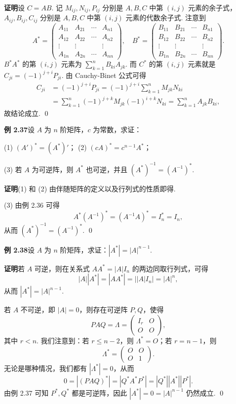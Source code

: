 \documentclass[UTF8, 12pt, fontset=fandol, oneside]{ctexart}
\begin{document}
\noindent\textbf{证明}\quad 设 $C=AB$. 记 $M_{ij},N_{ij},P_{ij}$ 分别是 $A,B,C$ 中第 $(i,j)$ 元素的余子式，$A_{ij},B_{ij},C_{ij}$ 分别是 $A,B,C$ 中第 $(i,j)$ 元素的代数余子式. 注意到
\[
A^*=
\left(
\begin{array}{cccc}
A_{11} & A_{21} & \cdots & A_{n1}\\
A_{12} & A_{22} & \cdots & A_{n2}\\
\vdots & \vdots & & \vdots\\
A_{1n} & A_{2n} & \cdots & A_{nn}
\end{array}
\right),\quad
B^*=
\left(
\begin{array}{cccc}
B_{11} & B_{21} & \cdots & B_{n1}\\
B_{12} & B_{22} & \cdots & B_{n2}\\
\vdots & \vdots & & \vdots\\
B_{1n} & B_{2n} & \cdots & B_{nn}
\end{array}
\right).
\]
$B^*A^*$ 的第 $(i,j)$ 元素为 $\sum\limits_{k=1}^n B_{ki}A_{jk}$. 而 $C^*$ 的第 $(i,j)$ 元素就是 $C_{ji}=(-1)^{j+i}P_{ji}$. 由 Cauchy-Binet 公式可得
\[
\begin{aligned}
C_{ji}
&=(-1)^{j+i}P_{ji}
=(-1)^{j+i}\sum_{k=1}^n M_{jk}N_{ki}\\
&=\sum_{k=1}^n(-1)^{j+k}M_{jk}(-1)^{i+k}N_{ki}
=\sum_{k=1}^n A_{jk}B_{ki},
\end{aligned}
\]
故结论成立. \qed

\noindent\textbf{例 2.37}\quad 设 $A$ 为 $n$ 阶矩阵，$c$ 为常数，求证：

(1) $(A')^*=(A^*)'$；\qquad
(2) $(cA)^*=c^{n-1}A^*$；

(3) 若 $A$ 为可逆阵，则 $A^*$ 也可逆，并且 $(A^*)^{-1}=(A^{-1})^*$.

\noindent\textbf{证明}\quad (1) 和 (2) 由伴随矩阵的定义以及行列式的性质即得.

(3) 由例 2.36 可得
\[
A^*(A^{-1})^*=(A^{-1}A)^*=I_n^*=I_n,
\]
从而 $(A^*)^{-1}=(A^{-1})^*$. \qed

\noindent\textbf{例 2.38}\quad 设 $A$ 为 $n$ 阶矩阵，求证：$|A^*|=|A|^{n-1}$.

\noindent\textbf{证明}\quad 若 $A$ 可逆，则在关系式 $AA^*=|A|I_n$ 的两边同取行列式，可得
\[
|A||A^*|=|AA^*|=||A|I_n|=|A|^n,
\]
从而 $|A^*|=|A|^{n-1}$.

若 $A$ 不可逆，即 $|A|=0$，则存在可逆阵 $P,Q$，使得
\[
PAQ=\Lambda=
\left(
\begin{array}{cc}
I_r & O\\
O & O
\end{array}
\right),
\]
其中 $r<n$. 我们注意到：若 $r\le n-2$，则 $\Lambda^*=O$；若 $r=n-1$，则
\[
\Lambda^*=
\left(
\begin{array}{cc}
O & O\\
O & 1
\end{array}
\right).
\]
无论是哪种情况，我们都有 $|\Lambda^*|=0$，从而
\[
0=|(PAQ)^*|=|Q^*A^*P^*|=|Q^*||A^*||P^*|.
\]
由例 2.37 可知 $P^*,Q^*$ 都是可逆阵，因此 $|A^*|=0=|A|^{n-1}$ 仍然成立. \qed
\end{document}
